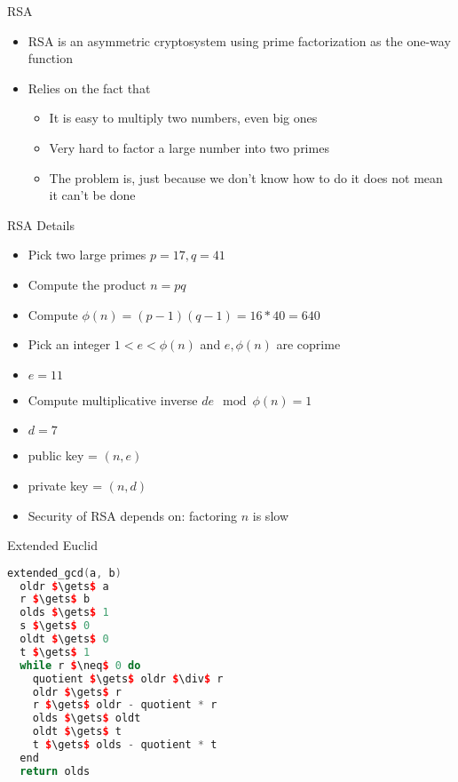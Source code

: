 \begin{withoutheadline}
\begin{frame}{RSA}
    \begin{itemize}
        \item RSA is an asymmetric cryptosystem using prime factorization as the one-way function
        \item Relies on the fact that
        \begin{itemize}
            \item It is easy to multiply two numbers, even big ones
            \item Very hard to factor a large number into two primes
            \item The problem is, just because we don't know how to do it does not mean it can't be done
        \end{itemize}
    \end{itemize}
\end{frame}

\begin{frame}{RSA Details}
    \begin{itemize}
        \item Pick two large primes $p=17, q=41$
        \item Compute the product $n = p q$
        \item Compute $ \phi(n) = ( p-1 )( q-1 ) = 16*40 = 640$
        \item Pick an integer $1 < e < \phi(n)$ and $e, \phi(n)$ are coprime
        \item $e = 11$
        \item Compute multiplicative inverse $d e \mod \phi(n) = 1$
        \item $d = 7$
        \item public key = $( n, e )$
        \item private key = $( n, d )$
        \item Security of RSA depends on: factoring $n$ is slow
    \end{itemize}
\end{frame}

\begin{frame}[fragile]{Extended Euclid}
\begin{lstlisting}[language=c++,mathescape=true]
extended_gcd(a, b)
  oldr $\gets$ a
  r $\gets$ b
  olds $\gets$ 1
  s $\gets$ 0
  oldt $\gets$ 0
  t $\gets$ 1
  while r $\neq$ 0 do
    quotient $\gets$ oldr $\div$ r
    oldr $\gets$ r
    r $\gets$ oldr - quotient * r
    olds $\gets$ oldt
    oldt $\gets$ t
    t $\gets$ olds - quotient * t
  end
  return olds
\end{lstlisting}    
\end{frame}


\end{withoutheadline}

